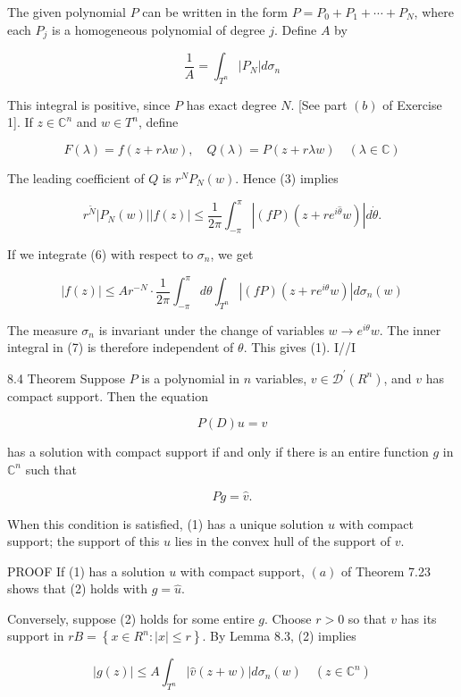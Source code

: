 \documentclass[10pt]{article}
\begin{document}
The given polynomial $P$ can be written in the form $P=P_{0}+P_{1}+\cdots+P_{N}$, where each $P_{j}$ is a homogeneous polynomial of degree $j$. Define $A$ by

$$
\frac{1}{A}=\int_{T^{n}}\left|P_{N}\right| d \sigma_{n}
$$

This integral is positive, since $P$ has exact degree $N$. [See part $(b)$ of Exercise 1]. If $z \in \mathbb{C}^{n}$ and $w \in T^{n}$, define

$$
F(\lambda)=f(z+r \lambda w), \quad Q(\lambda)=P(z+r \lambda w) \quad(\lambda \in \mathbb{C})
$$

The leading coefficient of $Q$ is $r^{N} P_{N}(w)$. Hence (3) implies

$$
r^{\tilde{N}}\left|P_{N}(w)\right||f(z)| \leq \frac{1}{2 \pi} \int_{-\pi}^{\pi}\left|(f P)\left(z+r e^{i \hat{\theta}} w\right)\right| d \dot{\theta} .
$$

If we integrate (6) with respect to $\sigma_{n}$, we get

$$
|f(z)| \leq A r^{-N} \cdot \frac{1}{2 \pi} \int_{-\pi}^{\pi} d \theta \int_{T^{n}}\left|(f P)\left(z+r e^{i \theta} w\right)\right| d \sigma_{n}(w)
$$

The measure $\sigma_{n}$ is invariant under the change of variables $w \rightarrow e^{i \theta} w$. The inner integral in (7) is therefore independent of $\theta$. This gives (1). I//I

8.4 Theorem Suppose $P$ is a polynomial in $n$ variables, $v \in \mathscr{D}^{\prime}\left(R^{n}\right)$, and $v$ has compact support. Then the equation

$$
P(D) u=v
$$

has a solution with compact support if and only if there is an entire function $g$ in $\mathbb{C}^{n}$ such that

$$
P g=\hat{v} .
$$

When this condition is satisfied, (1) has a unique solution $u$ with compact support; the support of this $u$ lies in the convex hull of the support of $v$.

PROOF If (1) has a solution $u$ with compact support, $(a)$ of Theorem 7.23 shows that (2) holds with $g=\hat{u}$.

Conversely, suppose (2) holds for some entire $g$. Choose $r>0$ so that $v$ has its support in $r B=\left\{x \in R^{n}:|x| \leq r\right\}$. By Lemma 8.3, (2) implies

$$
|g(z)| \leq A \int_{T^{n}}|\hat{v}(z+w)| d \sigma_{n}(w) \quad\left(z \in \mathbb{C}^{n}\right)
$$
\end{document}

